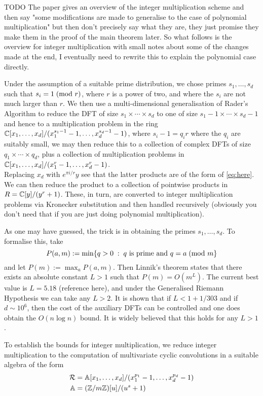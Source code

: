 TODO The paper gives an overview of the integer multiplication scheme and then say "some modifications are made to generalise to the case of polynomial multiplication" but then don't precisely say what they are, they just promise they make them in the proof of the main theorem later. So what follows is the overview for integer multiplication with small notes about some of the changes made at the end, I eventually need to rewrite this to explain the polynomial case directly.
\medskip

Under the assumption of a suitable prime distribution, we chose primes $s_1, \ldots, s_d$ such that $s_i = 1 \;(\textrm{mod } r)$, where $r$ is a power of two, and where the $s_i$ are not much larger than $r$. We then use a multi-dimensional generalisation of Rader's Algorithm to reduce the DFT of size $s_1 \times \cdots \times s_d$ to one of size $s_1-1 \times \cdots \times s_d-1$ and hence to a multiplication problem in the ring ${\mathbb C}[x_1, \ldots, x_d] / (x_1^{s_1 - 1} - 1, \ldots, x_d^{s_d - 1} - 1)$, where $s_i - 1 = q_i r$ where the $q_i$ are suitably small, we may then reduce this to a collection of complex DFTs of size $q_1 \times \cdots \times q_d$, plus a collection of multiplication problems in ${\mathbb C}[x_1, \ldots, x_d] / (x_1^r - 1, \ldots, x_d^r - 1)$. \\
Replacing $x_d$ with $e^{\pi i / r}y$ see that the latter products are of the form of \ref{eq:here}.  We can then reduce the product to a collection of pointwise products in $R = {\mathbb C}[y] / (y^r + 1)$. These, in turn, are converted to integer multiplication problems via Kronecker substitution and then handled recursively (obviously you don't need that if you are just doing polynomial multiplication).

As one may have guessed, the trick is in obtaining the primes $s_1, \ldots, s_d$. To formalise this, take
\[
    P(a, m) := \min\{q > 0\;:\; q \textrm{ is prime and } q = a \;(\textrm{mod } m\}
\]
and let $P(m) := \max_a P(a, m)$. Then Linnik's theorem states that there exists an absolute constant $L > 1$ such that $P(m) = O(m^L)$. The current best value is $L = 5.18$ (reference here), and under the Generalised Riemann Hypothesis we can take any $L > 2$. It is shown \cite{ffnlogn} that if $L < 1 + 1/303$ and if $d \sim 10^6$, then the cost of the auxiliary DFTs can be controlled and one does obtain the $O(n \log n)$ bound. It is widely believed that this holds for any $L > 1$.

To establish the bounds for integer multiplication, we reduce integer multiplication to the computation of multivariate cyclic convolutions in a suitable algebra of the form
\begin{align*}
    \mathcal R &= \mathbb{A}[x_1, \ldots, x_d] / (x_1^{p_1} - 1, \ldots, x_d^{p_d} - 1)\\
    \mathbb{A} &= ({\mathbb Z} / m{\mathbb Z})[u] / (u^s + 1)
\end{align*}

